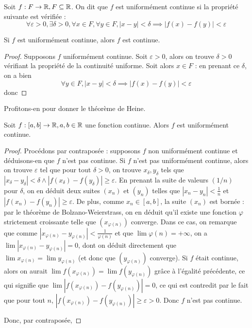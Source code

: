 \begin{defi}
    Soit $f : F \to\mathbb{R},F\subseteq\mathbb{R}$. On dit que $f$ est uniformément continue si la propriété suivante est vérifiée : $$\forall \varepsilon > 0,\exists \delta > 0,\forall x\in F,\forall y\in F, |x-y| < \delta \implies |f(x) - f(y)| < \varepsilon$$
\end{defi}

\begin{prop}
    Si $f$ est uniformément continue, alors $f$ est continue.
\end{prop}

\begin{proof}
    Supposons $f$ uniformément continue. Soit $\varepsilon > 0$, alors on trouve $\delta > 0$ vérifiant la propriété de la continuité uniforme. Soit alors $x\in F$ : en prenant ce $\delta$, on a bien $$\forall y\in F, |x-y| < \delta \implies |f(x)-f(y)| < \varepsilon$$ donc 
\end{proof}

Profitons-en pour donner le théorème de Heine.

\begin{them}[Heine]
    Soit $f : [a,b] \to \mathbb{R}, a,b\in\mathbb{R}$ une fonction continue. Alors $f$ est uniformément continue.
\end{them}

\begin{proof}
    Procédons par contraposée : supposons $f$ non uniformément continue et déduisons-en que $f$ n'est pas continue. Si $f$ n'est pas uniformément continue, alors on trouve $\varepsilon$ tel que pour tout $\delta > 0$, on trouve $x_\delta,y_\delta$ tels que $|x_\delta - y_\delta| < \delta \land |f(x_\delta)-f(y_\delta)| \geq \varepsilon$. En prenant la suite de valeurs $(1/n)$ pour $\delta$, on en déduit deux suites $(x_n)$ et $(y_n)$ telles que $|x_n - y_n| < \frac{1}{n}$ et $|f(x_n)-f(y_n)| \geq \varepsilon$. De plus, comme $x_n\in [a,b]$, la suite $(x_n)$ est bornée : par le théorème de Bolzano-Weierstrass, on en déduit qu'il existe une fonction $\varphi$ strictement croissante telle que $(x_{\varphi(n)})$ converge. Dans ce cas, on remarque que comme $|x_{\varphi(n)}-y_{\varphi(n)}| < \frac{1}{\varphi(n)}$ et que $\lim \varphi(n) = +\infty$, on a $\lim |x_{\varphi(n)}-y_{\varphi(n)}| = 0$, dont on déduit directement que $\lim x_{\varphi(n)} = \lim y_{\varphi(n)}$ (et donc que $(y_{\varphi(n)})$ converge). Si $f$ était continue, alors on aurait $\lim f(x_{\varphi(n)}) = \lim f(y_{\varphi(n)})$ grâce à l'égalité précédente, ce qui signifie que $\lim |f(x_{\varphi(n)})-f(y_{\varphi(n)})| = 0$, ce qui est contredit par le fait que pour tout $n$, $|f(x_{\varphi(n)})-f(y_{\varphi(n)})| \geq \varepsilon > 0$. Donc $f$ n'est pas continue.

    Donc, par contraposée, 
\end{proof}

